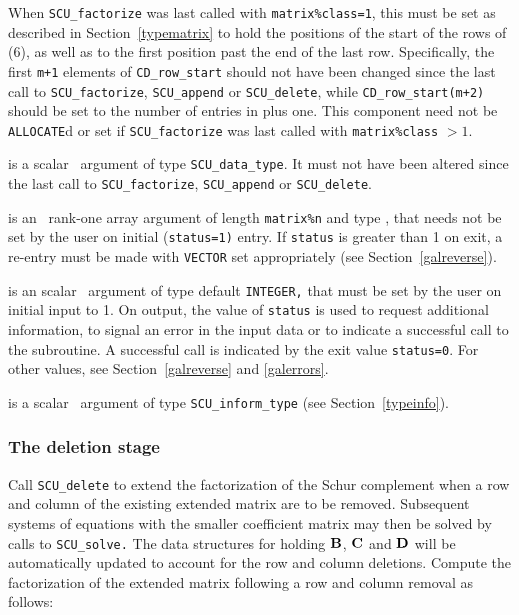 \documentclass{galahad}
\newcommand{\packagename}{SCU}
\begin{document}
\begin{description}
\begin{description}
When {\tt \packagename\_factorize} was last called with {\tt matrix\%class=1}, 
this must be set as described in Section~\ref{typematrix} to hold the 
positions of the start of the rows of (6), as well as to the first 
position past the end of the last row. 
Specifically, the first {\tt m+1} elements 
of {\tt CD\_row\_start} should not have been changed since the last call to 
{\tt \packagename\_factorize}, {\tt \packagename\_append} or 
{\tt \packagename\_delete}, while 
{\tt CD\_row\_start(m+2)} should be set to the number of entries in 
 plus one. 
This component need not be {\tt ALLOCATE}d or set if 
{\tt \packagename\_factorize} was last called with {\tt matrix\%class} $> 1$. 
 
\end{description} 
 
 is a scalar \intentinout\ argument of type 
{\tt \packagename\_data\_type}. 
It must not have been altered since the last call to  
{\tt \packagename\_factorize}, 
{\tt \packagename\_append} or 
{\tt \packagename\_delete}. 
 
 is an \intentinout\ rank-one array argument of length 
{\tt matrix\%n} 
and type \realdp, that needs not be set by 
the user on initial ({\tt status=1)} entry. If {\tt status} is greater than 
1 on exit, a re-entry must be made with {\tt VECTOR} set appropriately 
(see Section~\ref{galreverse}). 
 
 is an scalar \intentinout\ argument of type default 
{\tt INTEGER,} that  
must be set by the user on initial input to 1. On output, the value of 
{\tt status} 
is used to request additional information, to signal an error 
in the input data or to indicate a successful call to the subroutine. 
A successful call is indicated by the exit value {\tt status=0}. 
For other values, see Section~\ref{galreverse} and \ref{galerrors}. 
 
 is a scalar \intentinout\ argument of type 
{\tt \packagename\_inform\_type} (see Section~\ref{typeinfo}). 
 
\end{description}


\subsubsection{The deletion stage}
Call {\tt \packagename\_delete} to extend the factorization of the Schur 
complement when a row and column of the existing 
extended matrix are to be removed. 
Subsequent systems of equations with the smaller 
coefficient matrix may then be solved by calls to {\tt \packagename\_solve.} 
The data structures for holding ${\mathbf{B}}$, ${\mathbf{C}}$ and ${\mathbf{D}}$ will be 
automatically updated to account for the row and column deletions. 
Compute the factorization of the extended matrix 
following a row and column removal as follows:
\vspace*{1mm}
\end{document}
